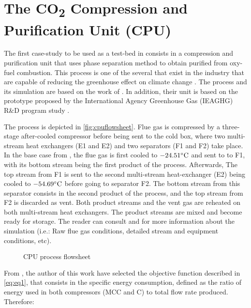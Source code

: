 \documentclass[../../msc-thesis.tex]{subfiles}
\begin{document}
\section{The CO\texorpdfstring{\textsubscript{2}}{\space} Compression and 
Purification Unit (CPU)}

The first case-study to be used as a test-bed in \mtc consists in a 
\co compression and purification unit that uses phase 
separation method to obtain purified \co from oxy-fuel 
combustion. This process is one of the several that exist in the industry 
that are capable of reducing the greenhouse effect on climate 
change \cite{Jin2015}. The process and its simulation are based on the work 
of \textcite{Liu2019}. In addition, their unit is based on the prototype 
proposed by the International Agency Greenhouse Gas (IEAGHG) R{\&}D 
program study \cite{Dillon2005}.

The process is depicted in \autoref{fig:cpuflowsheet}. Flue gas is compressed 
by a three-stage after-cooled compressor before being sent to the cold 
box, where two multi-stream heat exchangers (E1 and E2) and two separators 
(F1 and F2) take place. In the base case from \textcite{Liu2019}, the flue gas 
is first cooled to $-24.51\celsius$ and sent to to F1, with its bottom 
stream being the first product of the process. Afterwards, The top stream 
from F1 is sent to the second multi-stream heat-exchanger (E2) being cooled 
to $-54.69\celsius$ before going to separator F2. The bottom stream 
from this separator consists in the second product of the process, and the 
top stream from F2 is discarded as vent. Both \co product streams and the 
vent gas are reheated on both multi-stream heat exchangers. The \co product 
streams are mixed and become ready for storage. The reader can consult 
\textcite{Jin2015} and \textcite{Liu2019} for more information about the 
simulation (i.e.: Raw flue gas conditions, detailed stream and equipment 
conditions, etc).

\begin{figure}[htb]
    \caption{CPU process flowsheet}
    \centering
    \label{fig:cpuflowsheet}
\end{figure}

From \textcite{Liu2019}, the author of this work have selected the objective 
function described in \autoref{eq:eq1}, that consists in the specific energy 
consumption, defined as the ratio of energy used in both compressors 
(MCC and C) to total \co flow rate produced. Therefore:
\end{document}
